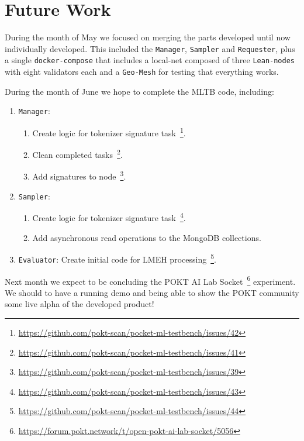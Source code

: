 \section{Future Work}\label{sec:z}

During the month of May we focused on merging the parts developed until now individually developed. 
This included the \texttt{Manager}, \texttt{Sampler} and \texttt{Requester}, plus a single \texttt{docker-compose} that includes a local-net composed of three \texttt{Lean-nodes} with eight validators each and a \texttt{Geo-Mesh} for testing that everything works. 

During the month of June we hope to complete the \gls{MLTB} code, including:
\begin{enumerate}
    \item \texttt{Manager}:
    \begin{enumerate}
        \item Create logic for tokenizer signature task~\footnote{\url{https://github.com/pokt-scan/pocket-ml-testbench/issues/42}}. 
        \item Clean completed tasks~\footnote{\url{https://github.com/pokt-scan/pocket-ml-testbench/issues/41}}. 
        \item Add signatures to node~\footnote{\url{https://github.com/pokt-scan/pocket-ml-testbench/issues/39}}. 
    \end{enumerate}

    \item \texttt{Sampler}:
    \begin{enumerate}
        \item Create logic for tokenizer signature task~\footnote{\url{https://github.com/pokt-scan/pocket-ml-testbench/issues/43}}. 
        \item Add asynchronous read operations to the MongoDB collections. 
    \end{enumerate}
    
    \item \texttt{Evaluator}: Create initial code for LMEH processing~\footnote{\url{https://github.com/pokt-scan/pocket-ml-testbench/issues/44}}. 

\end{enumerate}    

Next month we expect to be concluding the POKT AI Lab Socket~\footnote{\url{https://forum.pokt.network/t/open-pokt-ai-lab-socket/5056}} experiment. We should to have a running demo and being able to show the POKT community some live alpha of the developed product! 
